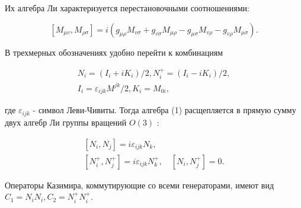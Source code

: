 \documentclass[10pt]{article}
\begin{document}
Их алгебра Ли характеризуется перестановочными соотношениями:



\[

\left[M_{\mu v}, M_{\rho \sigma}\right]=i\left(g_{\mu \rho} M_{v \sigma}+g_{v \sigma} M_{\mu \rho}-g_{\mu \sigma} M_{v \rho}-g_{v \rho} M_{\mu \sigma}\right) .

\]



В трехмерных обозначениях удобно перейти к комбинациям



\[

\begin{gathered}

N_{i}=\left(I_{i}+i K_{i}\right) / 2, N_{i}^{+}=\left(I_{i}-i K_{i}\right) / 2, \\

I_{i}=\varepsilon_{i j k} M^{j k} / 2, K_{i}=M_{0 i},

\end{gathered}

\]



где $\varepsilon_{i j k}$ - символ Леви-Чивиты. Тогда алгебра (1) расщепляется в прямую сумму двух алгебр Ли группы вращений $O(3)$ :



\[

\begin{gathered}

{\left[N_{i}, N_{j}\right]=i \varepsilon_{i j k} N_{k},} \\

{\left[N_{i}^{+}, N_{j}^{+}\right]=i \varepsilon_{i j k} N_{k}^{+}, \quad\left[N_{i}, N_{j}^{+}\right]=0 .}

\end{gathered}

\]



Операторы Казимира, коммутирующие со всеми генераторами, имеют вид $C_{1}=N_{i} N_{i}, C_{2}=N_{i}^{+} N_{i}^{+}$.
\end{document}
